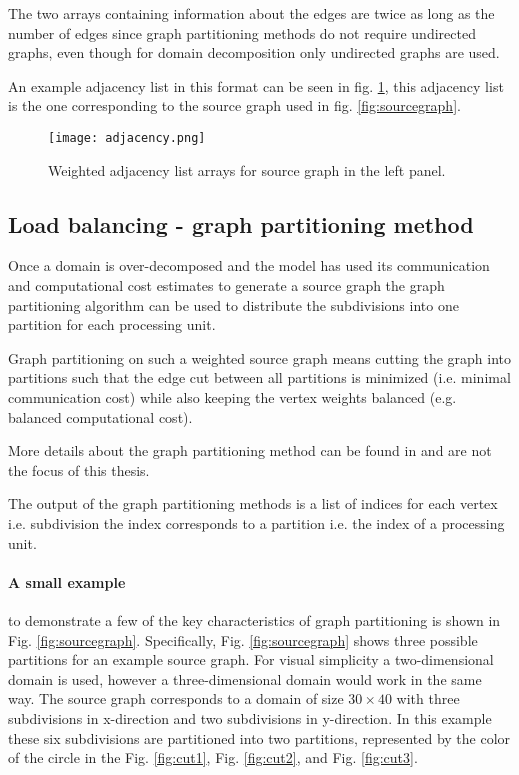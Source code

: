 The two arrays containing information about the edges are twice as long as the number of edges since graph partitioning methods do not require undirected graphs, even though for domain decomposition only undirected graphs are used.

An example adjacency list in this format can be seen in fig. \ref{fig:adjacency}, this adjacency list is the one corresponding to the source graph used in fig. \ref{fig:sourcegraph}.

\begin{figure}[!htbp]
  \centering
  \texttt{[image: adjacency.png]}
  \caption{Weighted adjacency list arrays for source graph in the left panel.}
  \label{fig:adjacency}
\end{figure}

\subsection{Load balancing - graph partitioning method}
Once a domain is over-decomposed and the model has used its communication and computational cost estimates to generate a source graph the graph partitioning algorithm can be used to distribute the subdivisions into one partition for each processing unit.

Graph partitioning on such a weighted source graph means cutting the graph into partitions such that the edge cut between all partitions is minimized (i.e. minimal communication cost) while also keeping the vertex weights balanced (e.g. balanced computational cost).

More details about the graph partitioning method can be found in \citet{karypis1998multilevel} and are not the focus of this thesis.

The output of the graph partitioning methods is a list of indices for each vertex i.e. subdivision the index corresponds to a partition i.e. the index of a processing unit.

\paragraph{A small example}to demonstrate a few of the key characteristics of graph partitioning is shown in Fig. \ref{fig:sourcegraph}.
Specifically, Fig. \ref{fig:sourcegraph} shows three possible partitions for an example source graph.
For visual simplicity a two-dimensional domain is used, however a three-dimensional domain would work in the same way.
The source graph corresponds to a domain of size $30 \times 40$ with three subdivisions in x-direction and two subdivisions in y-direction.
In this example these six subdivisions are partitioned into two partitions, represented by the color of the circle in the Fig. \ref{fig:cut1}, Fig. \ref{fig:cut2}, and Fig. \ref{fig:cut3}.

